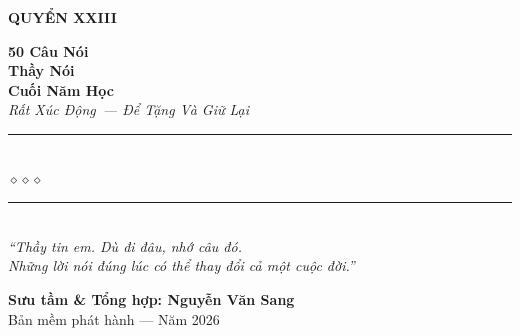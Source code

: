 \begin{titlepage}
\begin{center}
  \begin{tcolorbox}[
    width=6.5cm,
    colback=softrose!20,
    colframe=softrose!80!black,
    arc=4pt,
    boxrule=1.5pt,
    halign=center
  ]
    {\fontsize{18}{22}\selectfont\bfseries\color{inkdark!80!black}
     QUYỂN XXIII}
  \end{tcolorbox}
  \vspace{0.8cm}

  {\fontsize{28}{34}\selectfont\bfseries\color{inkdark!80!black}
    50 Câu Nói}\\[0.4cm]
  {\fontsize{28}{34}\selectfont\bfseries\color{softrose!80!black}
    Thầy Nói}\\[0.4cm]
  {\fontsize{28}{34}\selectfont\bfseries\color{inkdark!80!black}
    Cuối Năm Học}\\[0.4cm]

  {\fontsize{16}{20}\selectfont\color{softrose!90!black}\itshape
    Rất Xúc Động~--- Để Tặng Và Giữ Lại}\\[1cm]

  {\color{softblue!60}\rule{6cm}{1pt}}\\[5pt]
  {\color{softrose!80!black}\large$\diamond$\hspace{1cm}$\diamond$\hspace{1cm}$\diamond$}\\[5pt]
  {\color{softblue!60}\rule{6cm}{1pt}}\\[1.5cm]

  {\normalsize\itshape\color{softblue!90!black}
   ``Thầy tin em. Dù đi đâu, nhớ câu đó.\\
   Những lời nói đúng lúc có thể thay đổi cả một cuộc đời.''}

  \vfill

  {\fontsize{16}{20}\selectfont\bfseries\color{softblue!90!black}
    Sưu tầm \& Tổng hợp: \textbf{Nguyễn Văn Sang}}\\[0.4cm]

  {\small\color{gray} Bản mềm phát hành --- Năm 2026}\\[0.5cm]
\end{center}

\afterpage{\nopagecolor}
\end{titlepage}